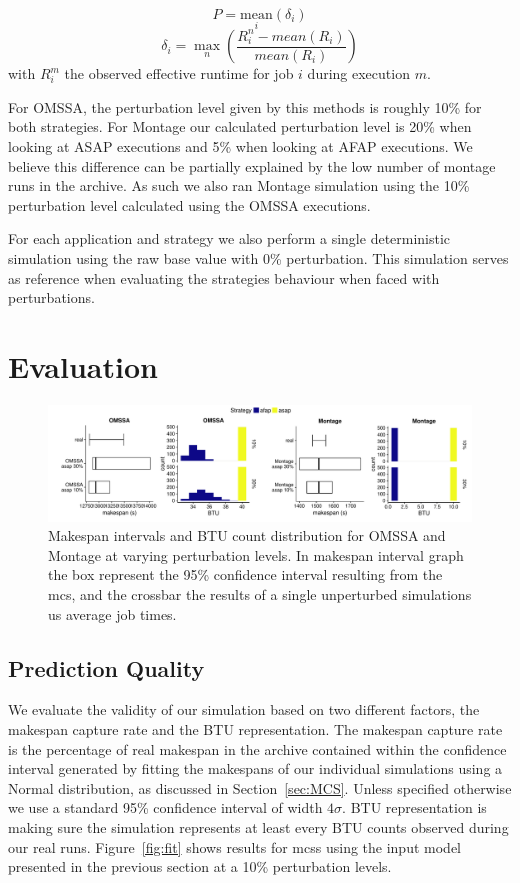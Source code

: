 \documentclass[10pt,conference,compsocconf]{IEEEtran}
\begin{document}
\[P = \underset{i}{\textrm{mean}}(\delta{}_i)\]
\[\delta{}_i = \max_n\left(\frac{R_i^n-mean(R_i)}{mean(R_i)}\right)\]
with $R_i^m$ the observed effective runtime for job $i$ during execution $m$. 

For OMSSA, the perturbation level given by this methods is roughly 10\% for both
strategies. For Montage  our calculated perturbation level is  20\% when looking
at ASAP  executions and  5\% when  looking at AFAP  executions. We  believe this
difference can be partially  explained by the low number of  montage runs in the
archive. As  such we  also ran  Montage simulation  using the  10\% perturbation
level calculated using the OMSSA executions.

For  each  application and  strategy  we  also  perform a  single  deterministic
simulation  using the  raw base  value  with 0\%  perturbation. This  simulation
serves as  reference when  evaluating the strategies  behaviour when  faced with
perturbations.

\section{Evaluation}
\label{sec:eval}

\begin{figure}
	\includegraphics[width=\textwidth]{gfx/int_plot.pdf}
	\caption{Makespan intervals and BTU count distribution for OMSSA and 
	Montage at varying perturbation levels.	In makespan interval graph the 
	box represent the 95\% confidence interval resulting from the \acs{mcs},
	and the crossbar the results of a single unperturbed simulations us 
	average job times.}\label{fig:int}
\end{figure}

\subsection{Prediction Quality}

We evaluate the validity of our simulation based on two different factors, the
makespan capture rate and the BTU representation. The makespan capture rate is
the percentage of real makespan in the archive contained within the confidence
interval generated by fitting the makespans of our individual simulations using
a Normal distribution, as discussed in Section~\ref{sec:MCS}. Unless specified
otherwise we use a standard 95\% confidence interval of width $4\sigma$. BTU
representation is making sure the simulation represents at least every BTU
counts observed during our real runs. Figure~\ref{fig:fit} shows results for
\acp{mcs} using the input model presented in the previous section at a 10\%
perturbation levels.
\end{document}
